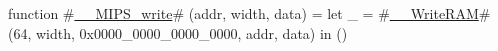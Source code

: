 function #\hyperref[zzyzyMIPSzywrite]{\_\_MIPS\_write}# (addr, width, data) = let _ = #\hyperref[zzyzyWriteRAM]{\_\_WriteRAM}#(64, width, 0x0000_0000_0000_0000, addr, data) in ()
